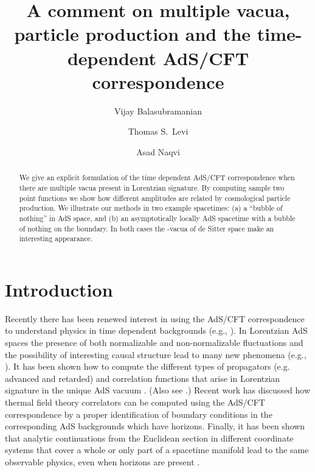 \documentclass[a4paper,aps,prd,preprintnumbers,groupedaddress]{revtex4}
\begin{document}

\title{A comment on multiple vacua, particle production and the time-dependent AdS/CFT correspondence}

\author{Vijay Balasubramanian}


\author{Thomas S.\ Levi}

\author{Asad Naqvi}

\begin{abstract}
We give an explicit formulation of the time dependent AdS/CFT correspondence when there are multiple vacua present in Lorentzian signature.
By computing sample two point functions we show how different amplitudes are related by cosmological particle production.  We illustrate our methods in two example spacetimes: (a) a ``bubble of nothing''  in AdS space, and (b) an asymptotically locally AdS spacetime with a bubble of nothing on the boundary.  In both cases the \myHighlight{$\alpha$}\coordHE{}-vacua of de Sitter space make an interesting appearance.
\end{abstract}


\pacs{}

\maketitle

\section{Introduction}
Recently there has been renewed interest in using the AdS/CFT correspondence to understand physics in time dependent backgrounds (e.g., \cite{adstime,birm,vijayross,son02,herzog02,danielsson,esko,troost02,kraus02}).
In  Lorentzian AdS spaces the presence of both normalizable and non-normalizable fluctuations and the possibility of interesting causal structure  lead to many new phenomena (e.g., \cite{vijay981,vijay982,banks98,vijay99,giddings99,danielsson,esko,AdSbh}).  It has been shown how to compute the different types of propagators  (e.g. advanced and retarded) and correlation functions that arise in Lorentzian signature in the unique AdS vacuum \cite{danielsson,esko}.  (Also see   \cite{troost02}.)   Recent work has discussed how thermal field theory correlators can be computed using the AdS/CFT correspondence by a proper identification of boundary conditions in the corresponding AdS backgrounds which have horizons\cite{son02,herzog02}.    Finally, it has been shown that analytic continuations from the Euclidean section in different coordinate systems that cover a whole or only part of a spacetime
manifold lead to the same observable physics, even when horizons are present \cite{kraus02}.
\end{document}
